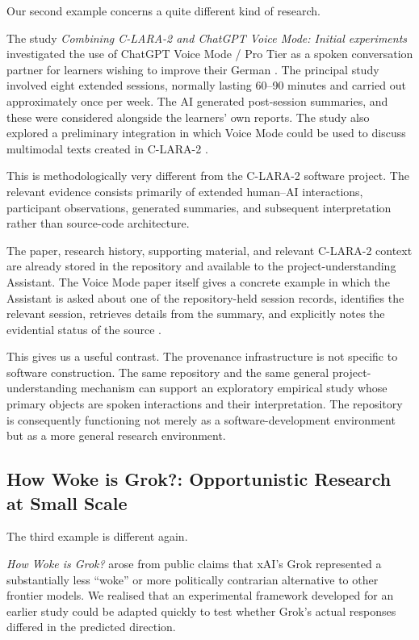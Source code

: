 \documentclass[12pt]{article}
\begin{document}
Our second example concerns a quite different kind of research.

The study \emph{Combining C-LARA-2 and ChatGPT Voice Mode: Initial experiments} investigated the use of ChatGPT Voice Mode / Pro Tier as a spoken conversation partner for learners wishing to improve their German \citep{wrightEtAl2026voice}.
The principal study involved eight extended sessions, normally lasting 60--90 minutes and carried out approximately once per week. The AI generated post-session summaries, and these were considered alongside the learners' own reports. The study also explored a preliminary integration in which Voice Mode could be used to discuss multimodal texts created in C-LARA-2 \citep[Sections~3--4]{wrightEtAl2026voice}.

This is methodologically very different from the C-LARA-2 software project. The relevant evidence consists primarily of extended human--AI interactions, participant observations, generated summaries, and subsequent interpretation rather than source-code architecture.

The paper, research history, supporting material, and relevant C-LARA-2 context are already stored in the repository and available to the project-understanding Assistant. The Voice Mode paper itself gives a concrete example in which the Assistant is asked about one of the repository-held session records, identifies the relevant session, retrieves details from the summary, and explicitly notes the evidential status of the source \citep[Section~5.2]{wrightEtAl2026voice}.

This gives us a useful contrast. The provenance infrastructure is not specific to software construction. The same repository and the same general project-understanding mechanism can support an exploratory empirical study whose primary objects are spoken interactions and their interpretation.
The repository is consequently functioning not merely as a software-development environment but as a more general research environment.


\subsection{How Woke is Grok?: Opportunistic Research at Small Scale}

The third example is different again.

\emph{How Woke is Grok?} \citep{raynerChatGPT2025grok} arose from public claims that xAI's Grok represented a substantially less ``woke'' or more politically contrarian alternative to other frontier models. We realised that an experimental framework developed for an earlier study could be adapted quickly to test whether Grok's actual responses differed in the predicted direction.
\end{document}
